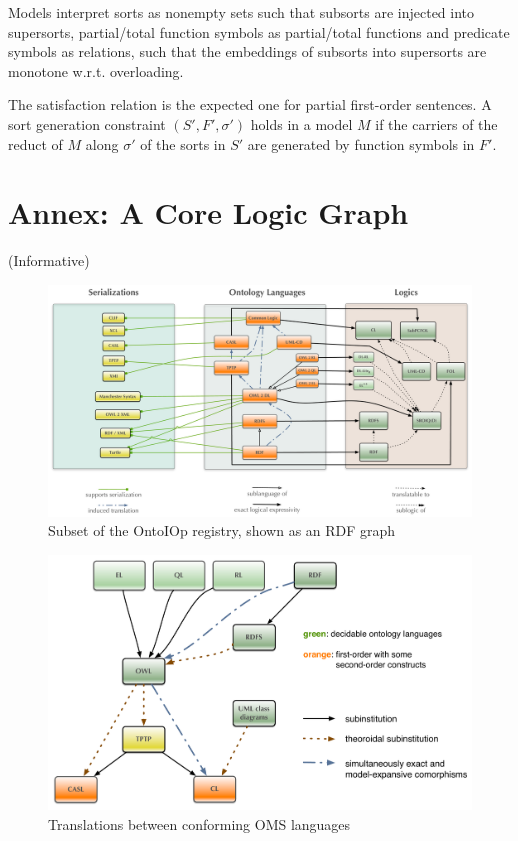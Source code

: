 \documentclass[10pt,fleqn,final]{scrreprt}
\newcommand{\informative}[0]{{\begin{center}{\Large{(Informative})}\end{center}} \bigskip}
\newcommand{\infannex}[1]{ \chapter{Annex: #1}  \informative }
\newenvironment{definitions}[0]{\medskip }{}
\begin{document}
\begin{definitions}
Models interpret sorts as nonempty sets such that subsorts are injected into supersorts,
partial/total function symbols as partial/total functions and 
predicate symbols as relations,
 such that the embeddings of subsorts into
supersorts are monotone w.r.t. overloading.

The satisfaction relation is the expected one for partial first-order sentences. A sort generation
constraint $(S', F', \sigma')$ holds in a model $M$ if the carriers of the reduct of $M$ along $\sigma'$ 
of the sorts in $S'$ are generated by function symbols in $F'$.

\infannex{A Core Logic Graph}\label{a:graph}


\begin{figure}
\centering
   \includegraphics[width=\textwidth]{illustrations/DOL-ontograph-layers-OMG} 
  \caption{Subset of the OntoIOp registry, shown as an RDF graph}
\label{f:DOL-threelayers}
\end{figure}


\begin{figure}
  \centering
  \includegraphics[width=\textwidth]{illustrations/ontograph-standards-new}
  \caption{Translations between conforming OMS languages}
  \label{fig:ontograph-standards}
\end{figure}


\end{definitions}
\end{document}
